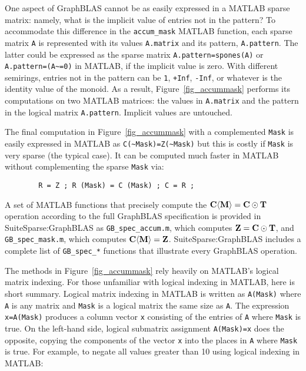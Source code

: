 \documentclass[12pt]{article}
\begin{document}
One aspect of GraphBLAS cannot be as easily expressed in a MATLAB sparse
matrix: namely, what is the implicit value of entries not in the pattern?  To
accommodate this difference in the \verb'accum_mask' MATLAB function, each
sparse matrix \verb'A' is represented with its values \verb'A.matrix' and its
pattern, \verb'A.pattern'.  The latter could be expressed as the sparse matrix
\verb'A.pattern=spones(A)' or \verb'A.pattern=(A~=0)' in MATLAB, if the
implicit value is zero.  With different semirings, entries not in the pattern
can be \verb'1', \verb'+Inf', \verb'-Inf', or whatever is the identity value of
the monoid.  As a result, Figure~\ref{fig_accummask} performs its computations
on two MATLAB matrices: the values in \verb'A.matrix' and the pattern in the
logical matrix \verb'A.pattern'.  Implicit values are untouched.

The final computation in Figure~\ref{fig_accummask}  with a complemented
\verb'Mask' is easily expressed in MATLAB as \verb'C(~Mask)=Z(~Mask)' but this
is costly if \verb'Mask' is very sparse (the typical case).  It can be computed
much faster in MATLAB without complementing the sparse \verb'Mask' via:

        {\footnotesize
        \begin{verbatim}
        R = Z ; R (Mask) = C (Mask) ; C = R ; \end{verbatim} }

A set of MATLAB functions that precisely compute the ${\bf C \langle M \rangle
= C \odot T}$ operation according to the full GraphBLAS specification is
provided in SuiteSparse:GraphBLAS as \verb'GB_spec_accum.m', which computes
${\bf Z=C\odot T}$, and \verb'GB_spec_mask.m', which computes ${\bf C \langle M
\rangle = Z}$.  SuiteSparse:GraphBLAS includes a complete list of
\verb'GB_spec_*' functions that illustrate every GraphBLAS operation.

The methods in Figure~\ref{fig_accummask} rely heavily on MATLAB's logical
matrix indexing.  For those unfamiliar with logical indexing in MATLAB, here is
short summary.  Logical matrix indexing in MATLAB is written as \verb'A(Mask)'
where \verb'A' is any matrix and \verb'Mask' is a logical matrix the same size
as \verb'A'.  The expression \verb'x=A(Mask)' produces a column vector \verb'x'
consisting of the entries of \verb'A' where \verb'Mask' is true.  On the
left-hand side, logical submatrix assignment \verb'A(Mask)=x' does the
opposite, copying the components of the vector \verb'x' into the places in
\verb'A' where \verb'Mask' is true.  For example, to negate all values greater
than 10 using logical indexing in MATLAB:
\end{document}
